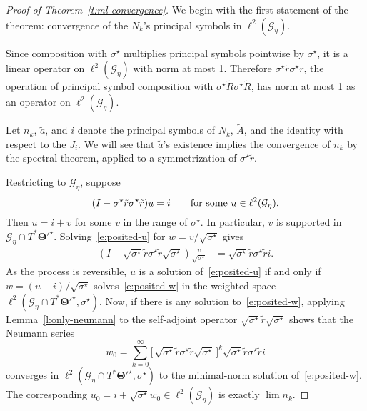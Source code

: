 \documentclass[10pt]{article}
\theoremstyle{plain}
\theoremstyle{definition}
\theoremstyle{remark}
\numberwithin{theorem}{section}
\numberwithin{example}{section}
\numberwithin{equation}{section}
\numberwithin{figure}{section}
\newcommand\bTheta{\boldsymbol\Theta}
\begin{document}
\begin{proof}[Proof of Theorem~\ref{t:ml-convergence}]	
	We begin with the first statement of the theorem: convergence of the $N_k$'s principal symbols in $\ell^2(\mathcal G_{\eta})$.
	
	 Since composition with $\sigma^\star$ multiplies principal symbols pointwise by $\sigma^\star$, it is a linear operator on $\ell^2(\mathcal G_\eta)$ with norm at most 1. Therefore $\sigma^\star\tilde r\sigma^\star\tilde r$, the operation of principal symbol composition with $\sigma^\star\tilde R\sigma^\star\tilde R$, has norm at most 1 as an operator on $\ell^2(\mathcal G_\eta)$. 

	Let $n_k$, $\tilde a$, and $i$ denote the principal symbols of $N_k$, $\tilde A$, and the identity with respect to the $J_i$. We will see that $\tilde a$'s existence implies the convergence of $n_k$ by the spectral theorem, applied to a symmetrization of $\sigma^\star\tilde r$.
	
	Restricting to $\mathcal G_\eta$, suppose
	\begin{equation}
		(I-\sigma^\star \tilde r\sigma^\star\tilde r)u=i \text{\qquad for some } u\in \ell^2(\mathcal G_\eta).
		\label{e:posited-u}
	\end{equation}
	Then $u=i+v$ for some $v$ in the range of $\sigma^\star$. In particular, $v$ is supported in $\mathcal G_\eta\cap T^*\bTheta'^\star$. Solving~\eqref{e:posited-u} for $w=v/\sqrt{\sigma^\star}$ gives
	\begin{align}
		(I-\sqrt{\sigma^\star} \tilde r\sigma^\star\tilde r \sqrt{\sigma^\star})\frac{v}{\sqrt{\sigma^\star}}	&=\sqrt{\sigma^\star}\tilde r\sigma^\star\tilde ri.
		\label{e:posited-w}
	\end{align}
	As the process is reversible, $u$ is a solution of~\eqref{e:posited-u} if and only if $w=(u-i)/\sqrt{\sigma^\star}$ solves~\eqref{e:posited-w} in the weighted space $\ell^2(\mathcal G_\eta\cap T^*\bTheta'^\star,\sigma^\star)$. Now, if there is any solution to~\eqref{e:posited-w}, applying Lemma~\ref{l:only-neumann} to the self-adjoint operator $\sqrt{\sigma^\star}\tilde r \sqrt{\sigma^\star}$ shows that the Neumann series
	\begin{equation}
		w_0 = \sum_{k=0}^\infty \big[\,\sqrt{\sigma^\star}\tilde r\sigma^\star \tilde r\sqrt{\sigma^\star}\,\big]^k \sqrt{\sigma^\star}\tilde r\sigma^\star\tilde ri
	\end{equation}
	converges in $\ell^2(\mathcal G_\eta\cap T^*\bTheta'^\star,\sigma^\star)$ to the minimal-norm solution of~\eqref{e:posited-w}. The corresponding $u_0=i+\sqrt{\sigma^\star} w_0\in\ell^2(\mathcal G_\eta)$ is exactly $\lim n_k$.
	

\end{proof}
\end{document}
